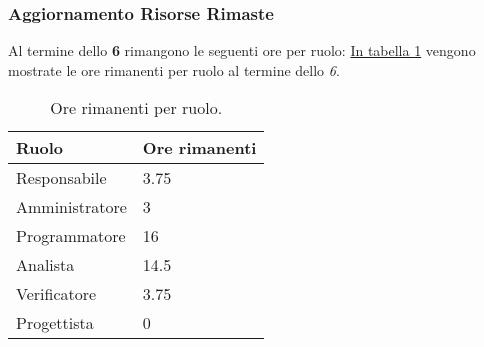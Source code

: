 \subsubsection{Aggiornamento Risorse Rimaste}
\label{sec:AggiornamentoRisorse_Sprint6}
Al termine dello \textbf{ 6} rimangono le seguenti ore per ruolo: \hyperref[tab:sprint6_ore_rimanenti]{In tabella \ref{tab:sprint6_ore_rimanenti}} vengono mostrate le ore rimanenti per ruolo al termine dello \textit{ 6}.

\begin{table}[H]
    \centering
    \begin{tabular}{| l | l |}
    \hline
    \textbf{Ruolo} & 
    \textbf{Ore rimanenti}\\
    \hline
        Responsabile & 3.75\\
    \hline
        Amministratore & 3\\
    \hline
        Programmatore & 16\\
    \hline
        Analista & 14.5\\
    \hline
        Verificatore & 3.75\\
    \hline
        Progettista & 0\\
    \hline
    \end{tabular}
    \caption{Ore rimanenti per ruolo.}
    \label{tab:sprint6_ore_rimanenti} 
\end{table}